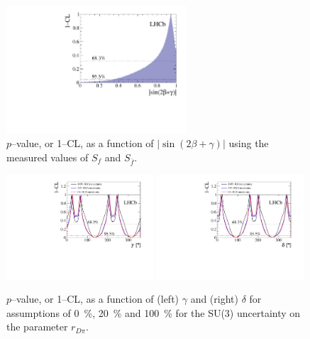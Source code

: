 \begin{figure}[t]
\centering
	\includegraphics[width=0.6\textwidth]{07Results/figs/gammacombo_sin_2b_g.pdf}
	\vspace{-2mm}
        \caption{$p$--value, or 1--CL, as a function of $\left|\sin\left(2\beta+\gamma\right)\right|$ using the measured values of $S_{f}$ and $S_{\bar f}$.}
	\label{fig:gammaCombo_sin2b+g}
\end{figure}

\begin{figure}[t]
\centering
	\includegraphics[width=0.49\textwidth]{07Results/figs/su3_scan_bd2dpi_g.pdf}
	\includegraphics[width=0.49\textwidth]{07Results/figs/su3_scan_bd2dpi_d.pdf}
	\vspace{-2mm}
        \caption{$p$--value, or 1--CL, as a function of (left) $\gamma$ and (right) $\delta$ for assumptions of \SI{0}{\percent}, \SI{20}{\percent} and \SI{100}{\percent}
  for the SU(3) uncertainty on the parameter $r_{D\pi}$.}
	\label{fig:SU3_gammaCombo_g_d}
\end{figure}

